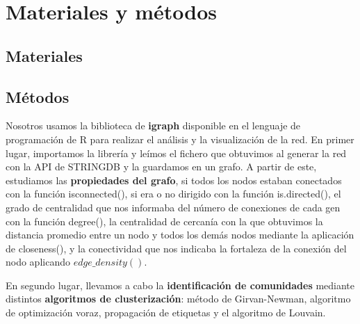 \section{Materiales y métodos}

\subsection{Materiales}

\subsection{Métodos}

Nosotros usamos la biblioteca de \textbf{igraph} disponible en el lenguaje de programación de R para realizar el análisis y la visualización de la red. En primer lugar, importamos la librería y leímos el fichero que obtuvimos al generar la red con la API de STRINGDB y la guardamos en un grafo. A partir de este, estudiamos las \textbf{propiedades del grafo}, si todos los nodos estaban conectados con la función isconnected(), si era o no dirigido con la función is.directed(), el grado de centralidad que nos informaba del número de conexiones de cada gen con la función degree(), la centralidad de cercanía con la que obtuvimos la distancia promedio entre un nodo y todos los demás nodos mediante la aplicación de closeness(), y la conectividad que nos indicaba la fortaleza de la conexión del nodo aplicando $edge\_density()$. 

\vspace{3pt}

En segundo lugar, llevamos a cabo la \textbf{identificación de comunidades} mediante distintos \textbf{algoritmos de clusterización}: método de Girvan-Newman, algoritmo de optimización voraz, propagación de etiquetas y el algoritmo de Louvain. 

